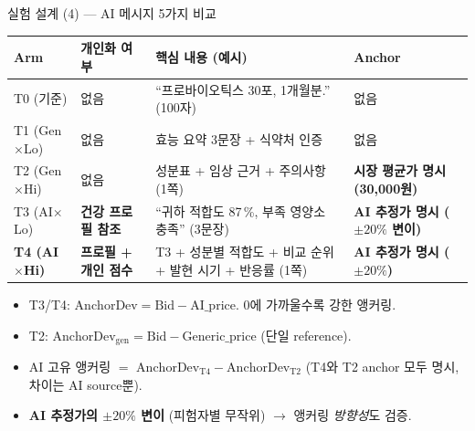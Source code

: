 \documentclass[aspectratio=169]{beamer}
\begin{document}
\begin{frame}{실험 설계 (4) --- AI 메시지 5가지 비교}
  \footnotesize
  \begin{tabular}{l|p{3.8cm}|p{4.6cm}|p{2cm}}
    \hline
    \textbf{Arm} & \textbf{개인화 여부} & \textbf{핵심 내용 (예시)} & \textbf{Anchor} \\
    \hline
    T0 (기준) & 없음 & ``프로바이오틱스 30포, 1개월분.'' (100자) & 없음 \\
    T1 (Gen$\times$Lo) & 없음 & 효능 요약 3문장 + 식약처 인증 & 없음 \\
    T2 (Gen$\times$Hi) & 없음 & 성분표 + 임상 근거 + 주의사항 (1쪽) & \textbf{시장 평균가 명시 (30,000원)} \\
    T3 (AI$\times$Lo) & \textbf{건강 프로필 참조} & ``귀하 적합도 87\,\%, 부족 영양소 충족'' (3문장) & \textbf{AI 추정가 명시 ($\pm 20\%$ 변이)} \\
    \textbf{T4 (AI$\times$Hi)} & \textbf{프로필 + 개인 점수} & T3 + 성분별 적합도 + 비교 순위 + 발현 시기 + 반응률 (1쪽) & \textbf{AI 추정가 명시 ($\pm 20\%$)} \\
    \hline
  \end{tabular}

  \vspace{0.6em}
  \small
  \begin{itemize}\itemsep0.05em
    \item T3/T4: $\mathrm{AnchorDev} = \mathrm{Bid} - \mathrm{AI\_price}$. 0에 가까울수록 강한 앵커링.
    \item T2: $\mathrm{AnchorDev}_{\text{gen}} = \mathrm{Bid} - \mathrm{Generic\_price}$ (단일 reference).
    \item AI 고유 앵커링 $=$ $\mathrm{AnchorDev}_{\text{T4}} - \mathrm{AnchorDev}_{\text{T2}}$ (T4와 T2 anchor 모두 명시, 차이는 AI source뿐).
    \item \textbf{AI 추정가의 $\pm 20\%$ 변이} (피험자별 무작위) $\rightarrow$ 앵커링 \emph{방향성}도 검증.
  \end{itemize}
\end{frame}
\end{document}
